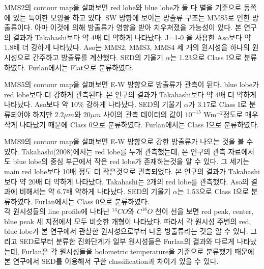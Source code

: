 MMS2의 contour map을 살펴보면 red lobe와 blue lobe가 둘 다 별을 기준으로 동쪽에 있는 특이한 모양을 하고 있다. SW 방향에 보이는 방출류 구조는 MMS5로 인한 방출류이다. 아마 이것에 의해 방출류가 영향을 받아 치우쳐졌을 가능성이 있다. 본 연구의 결과가 Takahashi보다 약 4배 더 약하게 나타났다. J=1-0 을 사용한 Aso보다 약 1.8배 더 강하게 나타났다. Aso는 MMS2, MMS3, MMS4 세 개의 원시성을 하나의 원시성으로 간주하고 방출류를 계산했다.\cite{Aso} SED의 기울기 $\alpha$는 1.23으로 Class I으로 분류하였다. Furlan에서는 Flat으로 분류하였다.\cite{HerschelFurlan} 

MMS5의 contour map을 살펴보면 E-W 방향으로 방출류가 관측이 된다. blue lobe가 red lobe보다 더 강하게 관측된다. 본 연구의 결과가 Takahashi보다 약 4배 더 약하게 나타났다. Aso보다 약 10\% 강하게 나타났다.\cite{Aso} SED의 기울기 $\alpha$가 3.17로 Class I로 분류되어야 하지만 $2.2\mu m$와 $20 \mu m$ 사이의 관측 데이터의 값이 $10^{-15}$ Wm$^{-2}$정도로 매우 작게 나타났기 때문에 Class 0으로 분류하였다. Furlan에서는 Class I으로 분류하였다.\cite{HerschelFurlan} 

MMS9의 contour map을 살펴보면  E-W 방향으로 강한 방출류가 나오는 것을 볼 수 있다. Takahashi(2008)에서는 red lobe를 두개 관측했는데, 본 연구의 관측 자료에서도 blue lobe의 중심 부근에서 작은 red lobe가 존재하는것을 알 수 있다. 그 세기는 main red lobe보다 10배 정도 더 작은것으로 관측되었다. 본 연구의 결과가 Takahashi보다 약 20배 더 약하게 나타났다. Takahashi는 2개의 red lobe를 관측했다.  Aso의 결과에 비해서는 약 6.7배 약하게 나타났다.\cite{Aso} SED의 기울기 $\alpha$는 1.53으로 Class I으로 분류하였다. Furlan에서는 Class 0으로 분류하였다.\cite{HerschelFurlan} 
\\

각 원시성들의 line profile에 나타난 $^{13}CO$와 $C^{18}O$ 천이 선을 보면 red peak, center, blue peak 세 지점에서 모두 비슷한 개형이 나타났다. 따라서 각 원시성 주변의 red, blue lobe가 본 연구에서 관찰한 원시성으로부터 나온 방출류라는 것을 알 수 있다. 그리고 SED로부터 분류한 진화단계가 일부 원시성들은 Furlan의 결과와 다르게 나타났는데, Furlan은 각 원시성들을 bolometric temperature을 기준으로 분류했기 때문에 본 연구에서 SED를 이용해서 구한 classification과 차이가 있을 수 있다.

\clearpage
\newpage   


